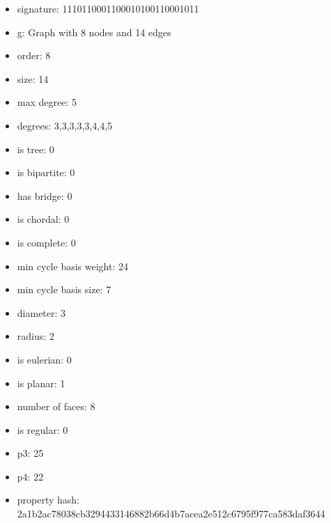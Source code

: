\begin{itemize}
\item signature: 1110110001100010100110001011
\item g: Graph with 8 nodes and 14 edges
\item order: 8
\item size: 14
\item max degree: 5
\item degrees: 3,3,3,3,3,4,4,5
\item is tree: 0
\item is bipartite: 0
\item has bridge: 0
\item is chordal: 0
\item is complete: 0
\item min cycle basis weight: 24
\item min cycle basis size: 7
\item diameter: 3
\item radius: 2
\item is eulerian: 0
\item is planar: 1
\item number of faces: 8
\item is regular: 0
\item p3: 25
\item p4: 22
\item property hash: 2a1b2ac78038cb3294433146882b66d4b7acea2e512c6795f977ca583daf3644
\end{itemize}
\newpage
\begin{figure}
\end{figure}

